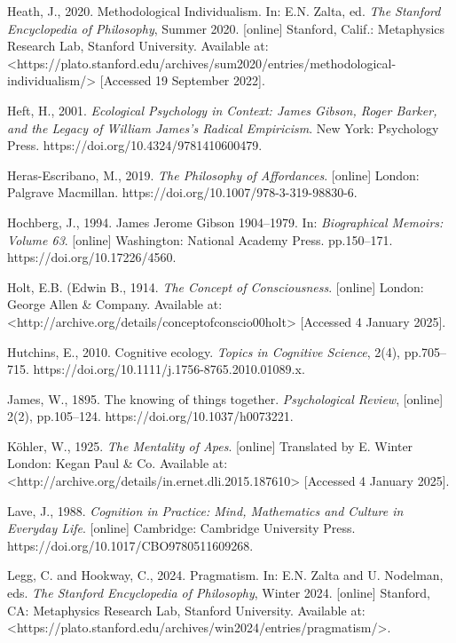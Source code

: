 Heath, J., 2020. Methodological Individualism. In: E.N. Zalta, ed. \textit{The Stanford Encyclopedia of Philosophy}, Summer 2020. [online] Stanford, Calif.: Metaphysics Research Lab, Stanford University. Available at: {\textless}https://plato.stanford.edu/archives/sum2020/entries/methodological-individualism/{\textgreater} [Accessed 19 September 2022].



Heft, H., 2001. \textit{Ecological Psychology in Context: James Gibson, Roger Barker, and the Legacy of William James's Radical Empiricism}. New York: Psychology Press. https://doi.org/10.4324/9781410600479.



Heras-Escribano, M., 2019. \textit{The Philosophy of Affordances}. [online] London: Palgrave Macmillan. https://doi.org/10.1007/978-3-319-98830-6.



Hochberg, J., 1994. James Jerome Gibson 1904–1979. In: \textit{Biographical Memoirs: Volume 63}. [online] Washington: National Academy Press. pp.150–171. https://doi.org/10.17226/4560.



Holt, E.B. (Edwin B., 1914. \textit{The Concept of Consciousness}. [online] London: George Allen \& Company. Available at: {\textless}http://archive.org/details/conceptofconscio00holt{\textgreater} [Accessed 4 January 2025].



Hutchins, E., 2010. Cognitive ecology. \textit{Topics in Cognitive Science}, 2(4), pp.705–715. https://doi.org/10.1111/j.1756-8765.2010.01089.x.



James, W., 1895. The knowing of things together. \textit{Psychological Review}, [online] 2(2), pp.105–124. https://doi.org/10.1037/h0073221.



Köhler, W., 1925. \textit{The Mentality of Apes}. [online] Translated by E. Winter London: Kegan Paul \& Co. Available at: {\textless}http://archive.org/details/in.ernet.dli.2015.187610{\textgreater} [Accessed 4 January 2025].



Lave, J., 1988. \textit{Cognition in Practice: Mind, Mathematics and Culture in Everyday Life}. [online] Cambridge: Cambridge University Press. https://doi.org/10.1017/CBO9780511609268.



Legg, C. and Hookway, C., 2024. Pragmatism. In: E.N. Zalta and U. Nodelman, eds. \textit{The Stanford Encyclopedia of Philosophy}, Winter 2024. [online] Stanford, CA: Metaphysics Research Lab, Stanford University. Available at: {\textless}https://plato.stanford.edu/archives/win2024/entries/pragmatism/{\textgreater}.




